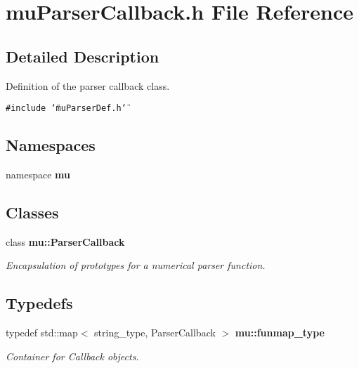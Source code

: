 \section{muParserCallback.h File Reference}
\label{muParserCallback_8h}


\subsection{Detailed Description}
Definition of the parser callback class. 



{\tt \#include \char`\"{}muParserDef.h\char`\"{}}\par
\subsection*{Namespaces}
\begin{CompactItemize}
\item 
namespace {\bf mu}
\end{CompactItemize}
\subsection*{Classes}
\begin{CompactItemize}
\item 
class {\bf mu::ParserCallback}
\begin{CompactList}\small\item\em Encapsulation of prototypes for a numerical parser function. \item\end{CompactList}\end{CompactItemize}
\subsection*{Typedefs}
\begin{CompactItemize}
\item 
typedef std::map$<$ string\_\-type, ParserCallback $>$ {\bf mu::funmap\_\-type}
\begin{CompactList}\small\item\em Container for Callback objects. \item\end{CompactList}\end{CompactItemize}
